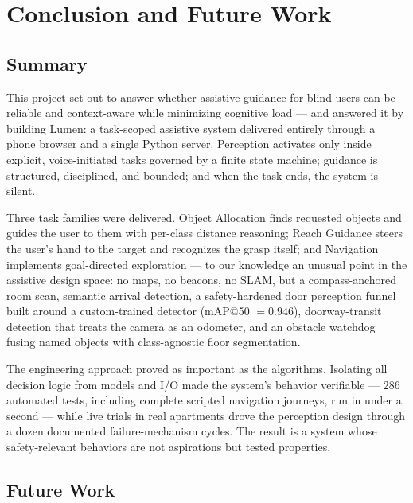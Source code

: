 \chapter{Conclusion and Future Work}
\label{ch:conclusion}

\section{Summary}

This project set out to answer whether assistive guidance for blind users can be
reliable and context-aware while minimizing cognitive load --- and answered it by
building Lumen: a task-scoped assistive system delivered entirely through a phone
browser and a single Python server. Perception activates only inside explicit,
voice-initiated tasks governed by a finite state machine; guidance is structured,
disciplined, and bounded; and when the task ends, the system is silent.

Three task families were delivered. Object Allocation finds requested objects and
guides the user to them with per-class distance reasoning; Reach Guidance steers the
user's hand to the target and recognizes the grasp itself; and Navigation implements
goal-directed exploration --- to our knowledge an unusual point in the assistive
design space: no maps, no beacons, no SLAM, but a compass-anchored room scan,
semantic arrival detection, a safety-hardened door perception funnel built around a
custom-trained detector (mAP@50 $=0.946$), doorway-transit detection that treats the
camera as an odometer, and an obstacle watchdog fusing named objects with
class-agnostic floor segmentation.

The engineering approach proved as important as the algorithms. Isolating all
decision logic from models and I/O made the system's behavior verifiable --- 286
automated tests, including complete scripted navigation journeys, run in under a
second --- while live trials in real apartments drove the perception design through
a dozen documented failure-mechanism cycles. The result is a system whose
safety-relevant behaviors are not aspirations but tested properties.

\section{Future Work}

